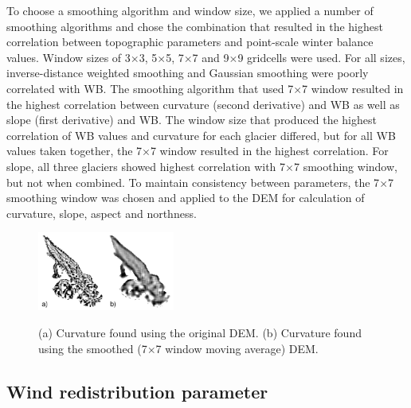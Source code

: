 \documentclass[onecolumn, letterpaper]{igs}
\begin{document}
To choose a smoothing algorithm and window size, we applied a number of smoothing algorithms and chose the combination that resulted in the highest correlation between topographic parameters and point-scale winter balance values. Window sizes of 3$\times$3, 5$\times$5, 7$\times$7 and 9$\times$9 gridcells were used. For all sizes, inverse-distance weighted smoothing and Gaussian smoothing were poorly correlated with WB. The smoothing algorithm that used 7$\times$7 window resulted in the highest correlation between curvature (second derivative) and WB as well as slope (first derivative) and WB. The window size that produced the highest correlation of WB values and curvature for each glacier differed, but for all WB values taken together, the 7$\times$7 window resulted in the highest correlation. For slope, all three glaciers showed highest correlation with 7$\times$7 smoothing window, but not when combined. To maintain consistency between parameters, the 7$\times$7 smoothing window was chosen and applied to the DEM for calculation of curvature, slope, aspect and northness. 

\begin{figure}[H]
	\centering
	\includegraphics[width = 0.4\textwidth]{G13curvatureSmoothing.jpeg}\\
	\caption[Curvature found using the original and smoothed DEM]{(a) Curvature found using the original DEM. (b) Curvature found using the smoothed (7$\times$7 window moving average) DEM.}
	\label{fig:smoothingCurve}
\end{figure}

\subsection*{Wind redistribution parameter} 
\end{document}
